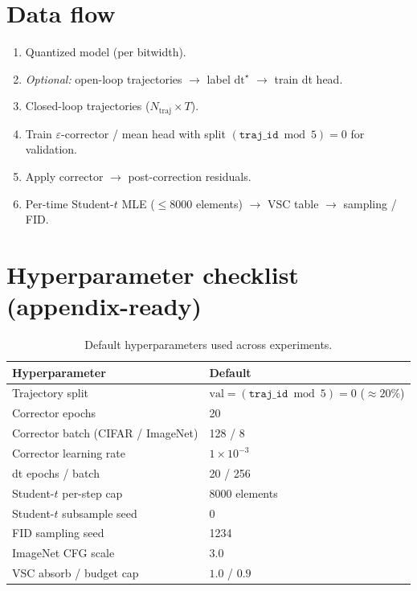 \documentclass[11pt]{article}
\newcommand{\trajid}{\texttt{traj\_id}}
\begin{document}
\section{Data flow}

\begin{enumerate}[leftmargin=*]
  \item Quantized model (per bitwidth).
  \item \emph{Optional:} open-loop trajectories $\rightarrow$ label $\mathrm{dt}^{\star}$ $\rightarrow$ train dt head.
  \item Closed-loop trajectories ($N_{\mathrm{traj}}\times T$).
  \item Train $\varepsilon$-corrector / mean head with split $(\trajid \bmod 5)=0$ for validation.
  \item Apply corrector $\rightarrow$ post-correction residuals.
  \item Per-time Student-$t$ MLE ($\le 8000$ elements) $\rightarrow$ VSC table $\rightarrow$ sampling / FID.
\end{enumerate}

\section{Hyperparameter checklist (appendix-ready)}

\begin{table}[t]
\centering
\caption{Default hyperparameters used across experiments.}
\label{tab:hparams}
\begin{tabular}{@{}ll@{}}
\toprule
\textbf{Hyperparameter} & \textbf{Default} \\
\midrule
Trajectory split & $\mathrm{val}=(\trajid \bmod 5)=0$ ($\approx 20\%$) \\
Corrector epochs & 20 \\
Corrector batch (CIFAR / ImageNet) & 128 / 8 \\
Corrector learning rate & $1\times 10^{-3}$ \\
dt epochs / batch & 20 / 256 \\
Student-$t$ per-step cap & 8000 elements \\
Student-$t$ subsample seed & 0 \\
FID sampling seed & 1234 \\
ImageNet CFG scale & 3.0 \\
VSC absorb / budget cap & $1.0$ / $0.9$ \\
\bottomrule
\end{tabular}
\end{table}
\end{document}
